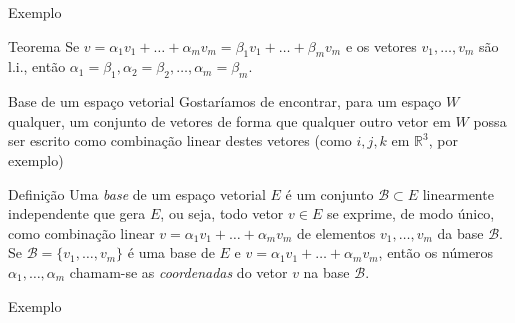 \documentclass{beamer}
\begin{document}
\begin{darkframes}
\begin{frame}{Exemplo}
\end{frame}

\begin{frame}{}
  \begin{block}{Teorema}
    Se $v=\alpha_1v_1+\ldots+\alpha_mv_m = \beta_1v_1+\ldots+\beta_mv_m$ e os vetores $v_1,\ldots,v_m$ são l.i., então $\alpha_1=\beta_1, \alpha_2=\beta_2, \ldots, \alpha_m=\beta_m$.
  \end{block}
\end{frame}

\begin{frame}{Base de um espaço vetorial}
  Gostaríamos de encontrar, para um espaço $W$ qualquer, um conjunto de vetores de forma que qualquer outro vetor em $W$ possa ser escrito como combinação linear destes vetores (como $i,j,k$ em ${\mathbb{R}}^3$, por exemplo)
  \begin{block}{Definição}
    Uma \emph{base} de um espaço vetorial $E$ é um conjunto ${\mathcal{B}}\subset E$ linearmente independente que gera $E$, ou seja, todo vetor $v\in E$ se exprime, de modo único, como combinação linear $v=\alpha_1 v_1 + \ldots + \alpha_m v_m$ de elementos $v_1,\ldots,v_m$ da base ${\mathcal{B}}$. Se ${\mathcal{B}} = \{ v_1,\ldots,v_m\}$ é uma base de $E$ e $v=\alpha_1 v_1 + \ldots +\alpha_mv_m$, então os números $\alpha_1,\ldots,\alpha_m$ chamam-se as \emph{coordenadas} do vetor $v$ na base ${\mathcal{B}}$.   
  \end{block}
\end{frame}

\begin{frame}{Exemplo}
\end{frame}


\end{darkframes}
\end{document}
